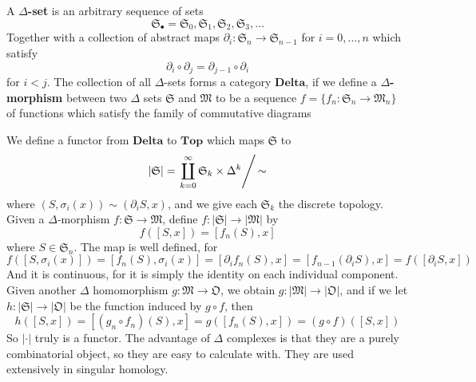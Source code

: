 A {\bf $\Delta$-set} is an arbitrary sequence of sets
%
\[ \mathfrak{S}_{\bullet} = \mathfrak{S}_0, \mathfrak{S}_1, \mathfrak{S}_2, \mathfrak{S}_3, \dots \]
%
Together with a collection of abstract maps $\partial_i : \mathfrak{S}_n \to \mathfrak{S}_{n-1}$ for $i = 0, \dots, n$ which satisfy
%
\[ \partial_i \circ \partial_j = \partial_{j-1} \circ \partial_i \]
%
for $i < j$. The collection of all $\Delta$-sets forms a category $\textbf{Delta}$, if we define a {\bf $\Delta$-morphism} between two $\Delta$ sets $\mathfrak{S}$ and $\mathfrak{M}$ to be a sequence $f = \{ f_n: \mathfrak{S}_n \to \mathfrak{M}_n \}$ of functions which satisfy the family of commutative diagrams
%
\begin{center}
\end{center}
%
We define a functor from $\textbf{Delta}$ to $\textbf{Top}$ which maps $\mathfrak{S}$ to
%
\[ |\mathfrak{S}| = \left. \coprod_{k = 0}^\infty \mathfrak{S}_k \times \Delta^k \right/ {\sim} \]
%
where $(S,\sigma_i(x)) \sim (\partial_i S, x)$, and we give each $\mathfrak{S}_k$ the discrete topology. Given a $\Delta$-morphism $f: \mathfrak{S} \to \mathfrak{M}$, define $f: |\mathfrak{S}| \to |\mathfrak{M}|$ by
%
\[ f([S,x]) = [f_n(S),x] \]
%
where $S \in \mathfrak{S}_n$. The map is well defined, for
%
\[ f([S,\sigma_i(x)]) = [f_n(S),\sigma_i(x)] = [\partial_i f_n(S), x] = [f_{n-1}(\partial_i S), x] = f([\partial_i S, x]) \]
%
And it is continuous, for it is simply the identity on each individual component. Given another $\Delta$ homomorphism $g: \mathfrak{M} \to \mathfrak{O}$, we obtain $g: |\mathfrak{M}| \to |\mathfrak{O}|$, and if we let $h: |\mathfrak{S}| \to |\mathfrak{O}|$ be the function induced by $g \circ f$, then
%
\[ h([S,x]) = [(g_n \circ f_n)(S), x] = g([f_n(S), x]) = (g \circ f)([S,x]) \]
%
So $| \cdot |$ truly is a functor. The advantage of $\Delta$ complexes is that they are a purely combinatorial object, so they are easy to calculate with. They are used extensively in singular homology.

